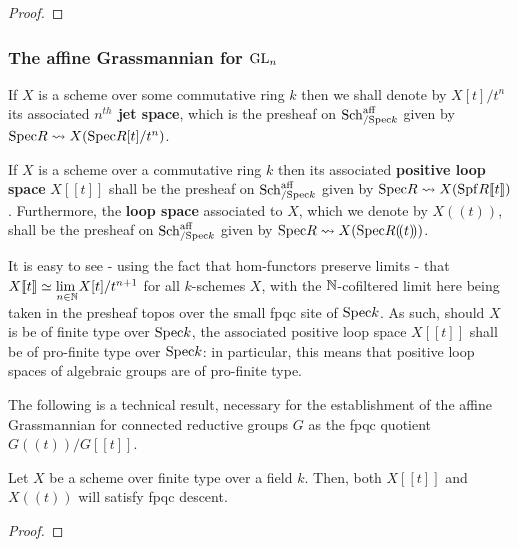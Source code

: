                 \begin{proof}
                    
                \end{proof}
            \begin{remark} \label{remark: ind_schemes_vs_formal_schemes}
                
            \end{remark}
    
        \subsubsection{The affine Grassmannian for \texorpdfstring{$\operatorname{GL}_n$}{}}
            \begin{definition} \label{def: jet_spaces}
                If $X$ is a scheme over some commutative ring $k$ then we shall denote by $X[t]/t^n$ its associated \textbf{$n^{th}$ jet space}, which is the presheaf on $\mathrm{Sch}_{/\mathrm{Spec} k}^{\mathrm{aff}}$ given by $\mathrm{Spec} R \leadsto X(\mathrm{Spec} R[t]/t^n)$.
            \end{definition}
            \begin{definition} \label{def: loop_spaces}
                If $X$ is a scheme over a commutative ring $k$ then its associated \textbf{positive loop space} $X[\![t]\!]$ shall be the presheaf on $\mathrm{Sch}_{/\mathrm{Spec} k}^{\mathrm{aff}}$ given by $\mathrm{Spec} R \leadsto X(\mathrm{Spf} R[\![t]\!])$. Furthermore, the \textbf{loop space} associated to $X$, which we denote by $X(\!(t)\!)$, shall be the presheaf on $\mathrm{Sch}_{/\mathrm{Spec} k}^{\mathrm{aff}}$ given by $\mathrm{Spec} R \leadsto X(\mathrm{Spec} R(\!(t)\!))$.
            \end{definition}
            \begin{remark}
                It is easy to see - using the fact that hom-functors preserve limits - that $X[\![t]\!] \simeq \underset{n \in \mathbb{N}}{\operatorname{lim} \:} X[t]/t^{n + 1}$ for all $k$-schemes $X$, with the $\mathbb{N}$-cofiltered limit here being taken in the presheaf topos over the small fpqc site of $\mathrm{Spec} k$. As such, should $X$ is be of finite type over $\mathrm{Spec} k$, the associated positive loop space $X[\![t]\!]$ shall be of pro-finite type over $\mathrm{Spec} k$: in particular, this means that positive loop spaces of algebraic groups are of pro-finite type.
            \end{remark}
            The following is a technical result, necessary for the establishment of the affine Grassmannian for connected reductive groups $G$ as the fpqc quotient $G(\!(t)\!)/G[\![t]\!]$.
            \begin{proposition} \label{prop: loop_spaces_are_fpqc_sheaves}
                Let $X$ be a scheme over finite type over a field $k$. Then, both $X[\![t]\!]$ and $X(\!(t)\!)$ will satisfy fpqc descent. 
            \end{proposition}
                \begin{proof}
                        
                \end{proof}
            

